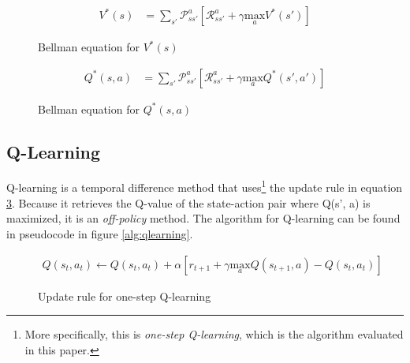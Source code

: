 \documentclass{article}
\begin{document}
\begin{figure}
\begin{align*}
V^*(s) &= \sum_{s'} \mathcal{P}^a_{ss'}\left[ \mathcal{R}^a_{ss'} + \gamma \underset{a}{\text{max}}V^*(s') \right]
\end{align*}
\caption{Bellman equation for $V^*(s)$}
\label{eq:bellmanV}
\end{figure}

\begin{figure}
\begin{align*}
Q^*(s,a) &= \sum_{s'} \mathcal{P}^a_{ss'}\left[ \mathcal{R}^a_{ss'} + \gamma \underset{a}{\text{max}}Q^*(s', a') \right]
\end{align*}
\caption{Bellman equation for $Q^*(s,a)$}
\label{eq:bellmanQ}
\end{figure}

\subsection*{Q-Learning} 
Q-learning is a temporal difference method that uses\footnote{More specifically, this is \textit{one-step Q-learning}, which is the algorithm evaluated in this paper.} the update rule in equation \ref{eq:qupdate}. Because it retrieves the Q-value of the state-action pair where Q(s', a) is maximized, it is an \textit{off-policy} method. The algorithm for Q-learning can be found in pseudocode in figure \ref{alg:qlearning}.

\begin{figure}
\begin{align*}
Q(s_t, a_t) \leftarrow Q(s_t,a_t) + \alpha \left[ r_{t+1} + \gamma \underset{a}{\text{max}} Q(s_{t+1},a) - Q(s_t,a_t)\right]
\end{align*}
\caption{Update rule for one-step Q-learning}
\label{eq:qupdate}
\end{figure}
\end{document}
